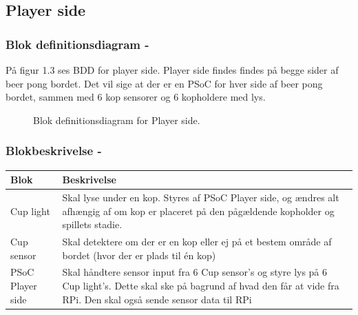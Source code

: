 \documentclass[Arkitektur/System_main.tex]{subfiles}
\begin{document}
\subsection{Player side} \label{sec:playerside_hardware}
\subsubsection{Blok definitionsdiagram - }

På figur 1.3 ses BDD for player side. Player side findes findes på begge sider af beer pong bordet. Det vil sige at der er en PSoC for hver side af beer pong bordet, sammen med 6 kop sensorer og 6 kopholdere med lys.

\begin{figure}[H]
    \centering
    \caption{Blok definitionsdiagram for Player side.}
    \label{fig:playerside_hardware_bdd}
\end{figure}

\subsubsection{Blokbeskrivelse - }

\begin{table}[H]
\begin{tabular}{L{0.2\columnwidth}|L{0.8\columnwidth}}
\hline
\textbf{Blok} & \textbf{Beskrivelse} \\ \hline
Cup light & Skal lyse under en kop. Styres af PSoC Player side, og ændres alt afhængig af om kop er placeret på den pågældende kopholder og spillets stadie.\\ \hline
Cup sensor & Skal detektere om der er en kop eller ej på et bestem område af bordet (hvor der er plads til én kop)\\ \hline
PSoC Player side & Skal håndtere sensor input fra 6 Cup sensor's og styre lys på 6 Cup light's. Dette skal ske på bagrund af hvad den får at vide fra RPi. Den skal også sende sensor data til RPi\\ \hline
\end{tabular}
\end{table}
\end{document}
